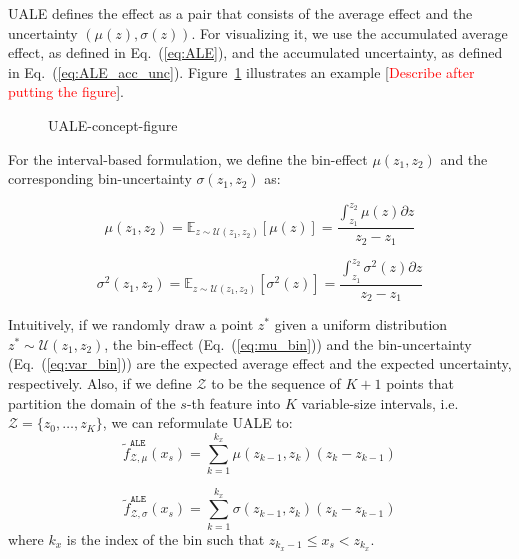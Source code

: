 \documentclass[twoside]{article}
\newcommand{\todo}[1]{[\textcolor{red}{#1}]}
\begin{document}
UALE defines the effect as a pair that consists of the average effect
and the uncertainty \((\mu(z), \sigma(z))\). For visualizing it, we
use the accumulated average effect, as defined in Eq.~(\ref{eq:ALE}),
and the accumulated uncertainty, as defined in
Eq.~(\ref{eq:ALE_acc_unc}). Figure~\ref{fig:UALE-figure} illustrates
an example \todo{Describe after putting the figure}.

\begin{figure}
  \centering
  \caption{UALE-concept-figure}
  \label{fig:UALE-figure}
\end{figure}

For the interval-based formulation, we define the bin-effect
\(\mu(z_1, z_2)\) and the corresponding bin-uncertainty
\(\sigma(z_1, z_2)\) as:

\begin{equation}
  \label{eq:mu_bin}
    \mu(z_1, z_2) = \mathbb{E}_{z \sim \mathcal{U}(z_1,z_2)} [\mu(z)]
    = \frac{\int_{z_1}^{z_2} \mu(z) \partial z}{z_2 - z_1}
\end{equation}

\begin{equation}
  \label{eq:var_bin}
  \sigma^2(z_1, z_2) = \mathbb{E}_{z \sim \mathcal{U}(z_1,z_2)} [\sigma^2(z)] =  \frac{\int_{z_1}^{z_2} \sigma^2(z)  \partial z}{z_2 - z_1}
\end{equation}

%
Intuitively, if we randomly draw a point \(z^*\) given a uniform
distribution \(z^* \sim \mathcal{U}(z_1, z_2)\), the bin-effect
(Eq.~(\ref{eq:mu_bin})) and the bin-uncertainty
(Eq.~(\ref{eq:var_bin})) are the expected average effect and the
expected uncertainty, respectively. Also, if we define \(\mathcal{Z}\)
to be the sequence of \(K+1\) points that partition the domain of the
\(s\)-th feature into \(K\) variable-size intervals, i.e.
\(\mathcal{Z} = \{z_0, \ldots, z_K\}\), we can reformulate UALE to:
\begin{equation}
  \label{eq:ALE_2}
  \tilde{f}^{\mathtt{ALE}}_{\mathcal{Z}, \mu}(x_s) = \sum_{k=1}^{k_x} \mu(z_{k-1}, z_k) (z_k - z_{k-1})
\end{equation}

\begin{equation}
  \label{eq:ALE_accumulated_var}
  \tilde{f}^{\mathtt{ALE}}_{\mathcal{Z}, \sigma}(x_s) =  \sum_{k=1}^{k_x} \sigma(z_{k-1}, z_k) (z_k - z_{k-1})
\end{equation}
%
where \(k_x\) is the index of the bin such that
\( z_{k_x - 1} \leq x_s < z_{k_x}\).
\end{document}
